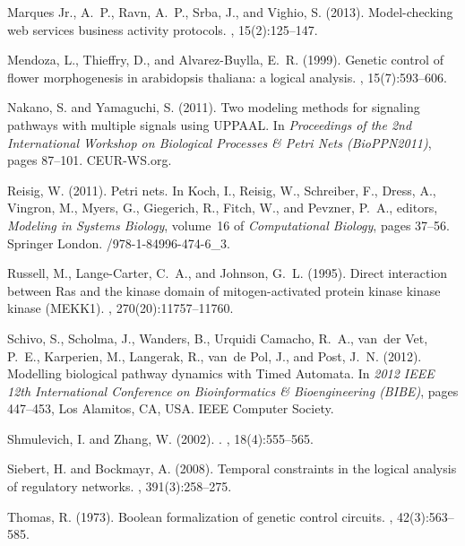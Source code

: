 \documentclass{bioinfo}
\begin{document}
\begin{thebibliography}{}
{Marques Jr.}, A.~P., Ravn, A.~P., Srba, J., and Vighio, S. (2013).
\newblock Model-checking web services business activity protocols.
, 15(2):125--147.

Mendoza, L., Thieffry, D., and Alvarez-Buylla, E.~R. (1999).
\newblock Genetic control of flower morphogenesis in arabidopsis thaliana: a
  logical analysis.
, 15(7):593--606.

Nakano, S. and Yamaguchi, S. (2011).
\newblock Two modeling methods for signaling pathways with multiple signals
  using {UPPAAL}.
\newblock In {\em Proceedings of the 2nd International Workshop on Biological
  Processes \& Petri Nets {(BioPPN2011)}}, pages 87--101. CEUR-WS.org.

Reisig, W. (2011).
\newblock Petri nets.
\newblock In Koch, I., Reisig, W., Schreiber, F., Dress, A., Vingron, M.,
  Myers, G., Giegerich, R., Fitch, W., and Pevzner, P.~A., editors, {\em
  Modeling in Systems Biology}, volume~16 of {\em Computational Biology}, pages
  37--56. Springer London.
/978-1-84996-474-6\_3.

Russell, M., Lange-Carter, C.~A., and Johnson, G.~L. (1995).
\newblock Direct interaction between {Ras} and the kinase domain of
  mitogen-activated protein kinase kinase kinase ({MEKK1}).
, 270(20):11757--11760.

Schivo, S., Scholma, J., Wanders, B., {Urquidi Camacho}, R.~A., van~der Vet,
  P.~E., Karperien, M., Langerak, R., van~de Pol, J., and Post, J.~N. (2012).
\newblock Modelling biological pathway dynamics with {Timed Automata}.
\newblock In {\em 2012 IEEE 12th International Conference on Bioinformatics \&
  Bioengineering (BIBE)}, pages 447--453, Los Alamitos, CA, USA. IEEE Computer
  Society.

Shmulevich, I. and Zhang, W. (2002).
.
, 18(4):555--565.

Siebert, H. and Bockmayr, A. (2008).
\newblock Temporal constraints in the logical analysis of regulatory networks.
, 391(3):258--275.

Thomas, R. (1973).
\newblock Boolean formalization of genetic control circuits.
, 42(3):563--585.

\end{thebibliography}







\end{document}
